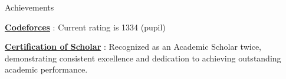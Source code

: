 \documentclass{resume} %
\begin{document}
\vspace{-0.5em}

\begin{rSection}{Achievements}
\vspace{-0.5em}
\vspace{-0.5em}
\item 
\href{https://codeforces.com/profile/Mulya_patel}{\textbf{Codeforces}} : Current rating is 1334 (pupil)
\vspace{-0.5em}
\item \textbf{\href{https://drive.google.com/file/d/1xn0DJjMOEhV5HE4aosNxawvSE9F0LmBY/view?usp=sharing}{Certification of Scholar}} : Recognized as an Academic Scholar twice, demonstrating consistent excellence and dedication to achieving outstanding academic performance.



\end{rSection}



    




\end{document}
